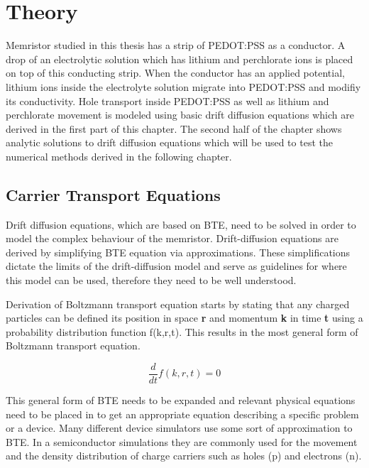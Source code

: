 
\chapter{Theory} %

\label{Chapter2} %

\begin{doublespace}
Memristor studied in this thesis has a strip of PEDOT:PSS as a conductor. A drop of an electrolytic solution which has lithium and perchlorate ions is placed on top of this conducting strip. When the conductor has an applied potential, lithium ions inside the electrolyte solution migrate into PEDOT:PSS and modifiy its conductivity. Hole transport inside PEDOT:PSS as well as lithium and perchlorate movement is modeled using basic drift diffusion equations which are derived in the first part of this chapter. The second half of the chapter shows analytic solutions to drift diffusion equations which will be used to test the numerical methods derived in the following chapter.


\section{Carrier Transport Equations}
Drift diffusion equations, which are based on BTE, need to be solved in order to model the complex behaviour of the memristor. Drift-diffusion equations are derived by simplifying BTE equation via approximations. These simplifications dictate the limits of the drift-diffusion model and serve as guidelines for where this model can be used, therefore they need to be well understood.

Derivation of Boltzmann transport equation starts by stating that any charged particles can be defined its position in space \textbf{r} and momentum \textbf{k} in time \textbf{t} using a probability distribution function f(k,r,t). This results in the most general form of Boltzmann transport equation.

\begin{equation}
\frac{d }{dt}f(k,r,t)=0
\end{equation}

This general form of BTE needs to be expanded and relevant physical equations need to be placed in to get an appropriate equation describing a specific problem or a device. 
Many different device simulators use some sort of approximation to BTE. In a semiconductor simulations they are commonly used for the movement and the density distribution of charge carriers such as holes (p) and electrons (n). 


\end{doublespace}
